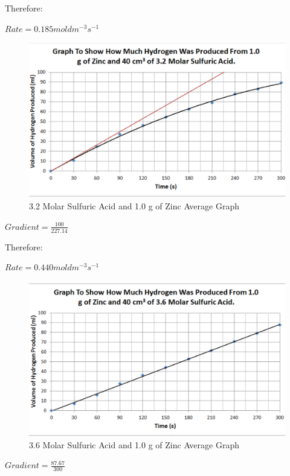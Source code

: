 Therefore:

$Rate = 0.185 mol dm^{-3} s^{-1}$

\begin{figure}[H]
    \includegraphics[width=\textwidth]{./Analysis/Images/1NonCatalyst/32Molar.pdf}
    \caption{3.2 Molar Sulfuric Acid and 1.0 g of Zinc Average Graph} \label{fig:32MolarSAGradient}
\end{figure}

$Gradient = \frac{100}{227.14}$

Therefore:

$Rate = 0.440 mol dm^{-3} s^{-1}$

\begin{figure}[H]
    \includegraphics[width=\textwidth]{./Analysis/Images/1NonCatalyst/36Molar.pdf}
    \caption{3.6 Molar Sulfuric Acid and 1.0 g of Zinc Average Graph} \label{fig:36MolarSAGradient}
\end{figure}

$Gradient = \frac{87.67}{300}$


